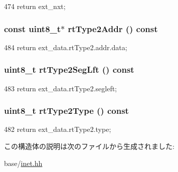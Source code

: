 \begin{DoxyCode}
474 { return ext_nxt; }
\end{DoxyCode}
\hypertarget{structNet_1_1Ip6Opt_aa75855e56afe6f1a873a89ec9065eece}{
\subsubsection[{rtType2Addr}]{\setlength{\rightskip}{0pt plus 5cm}const uint8\_\-t$\ast$ rtType2Addr () const}}
\label{structNet_1_1Ip6Opt_aa75855e56afe6f1a873a89ec9065eece}



\begin{DoxyCode}
484 { return ext_data.rtType2.addr.data; }
\end{DoxyCode}
\hypertarget{structNet_1_1Ip6Opt_abd5ab0d9ec38e56938b883bf078a505e}{
\subsubsection[{rtType2SegLft}]{\setlength{\rightskip}{0pt plus 5cm}uint8\_\-t rtType2SegLft () const}}
\label{structNet_1_1Ip6Opt_abd5ab0d9ec38e56938b883bf078a505e}



\begin{DoxyCode}
483 { return ext_data.rtType2.segleft; }
\end{DoxyCode}
\hypertarget{structNet_1_1Ip6Opt_ae4c748b4f01abc85d308a627b0278519}{
\subsubsection[{rtType2Type}]{\setlength{\rightskip}{0pt plus 5cm}uint8\_\-t rtType2Type () const}}
\label{structNet_1_1Ip6Opt_ae4c748b4f01abc85d308a627b0278519}



\begin{DoxyCode}
482 { return ext_data.rtType2.type; }
\end{DoxyCode}


この構造体の説明は次のファイルから生成されました:\begin{DoxyCompactItemize}
\item 
base/\hyperlink{inet_8hh}{inet.hh}\end{DoxyCompactItemize}
